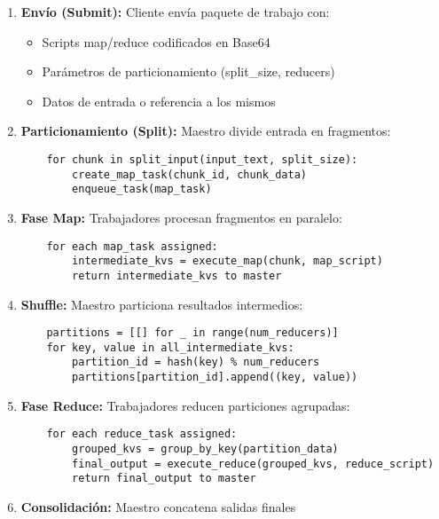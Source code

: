 \begin{enumerate}
    \item \textbf{Envío (Submit):} Cliente envía paquete de trabajo con:
    \begin{itemize}
        \item Scripts map/reduce codificados en Base64
        \item Parámetros de particionamiento (split\_size, reducers)
        \item Datos de entrada o referencia a los mismos
    \end{itemize}
    
    \item \textbf{Particionamiento (Split):} Maestro divide entrada en fragmentos:
    \begin{verbatim}
    for chunk in split_input(input_text, split_size):
        create_map_task(chunk_id, chunk_data)
        enqueue_task(map_task)
    \end{verbatim}
    
    \item \textbf{Fase Map:} Trabajadores procesan fragmentos en paralelo:
    \begin{verbatim}
    for each map_task assigned:
        intermediate_kvs = execute_map(chunk, map_script)
        return intermediate_kvs to master
    \end{verbatim}
    
    \item \textbf{Shuffle:} Maestro particiona resultados intermedios:
    \begin{verbatim}
    partitions = [[] for _ in range(num_reducers)]
    for key, value in all_intermediate_kvs:
        partition_id = hash(key) % num_reducers
        partitions[partition_id].append((key, value))
    \end{verbatim}
    
    \item \textbf{Fase Reduce:} Trabajadores reducen particiones agrupadas:
    \begin{verbatim}
    for each reduce_task assigned:
        grouped_kvs = group_by_key(partition_data)
        final_output = execute_reduce(grouped_kvs, reduce_script)
        return final_output to master
    \end{verbatim}
    
    \item \textbf{Consolidación:} Maestro concatena salidas finales
\end{enumerate}

